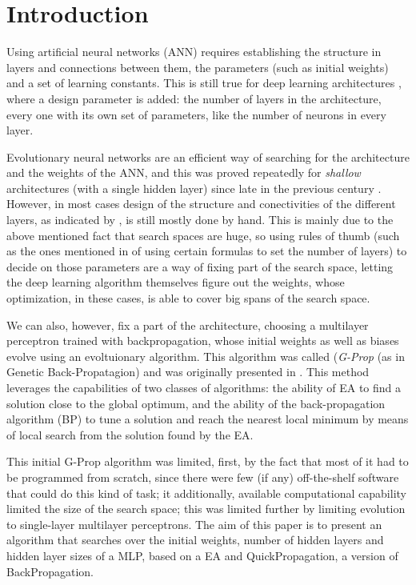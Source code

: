 \documentclass[runningheads]{llncs}
\begin{document}
\section{Introduction}

Using artificial neural networks (ANN) requires establishing the
structure in layers and connections between them, the parameters (such
as initial weights) and a set of learning constants. This is still
true for deep learning architectures \cite{goodfellow,nielsen}, where
a design parameter is added: the number of layers in the architecture,
every one with its own set of parameters, like the number of neurons
in every layer.

Evolutionary neural networks are an efficient way of searching for the
architecture and the weights of the ANN, and this was proved
repeatedly for {\em shallow} architectures (with a single hidden
layer) since late in the previous century
\cite{CastilloNPL,stanley2002evolving}. However, in most cases design
of the structure and conectivities of the different layers, as
indicated by \cite{miikkulainen2019evolving}, is still mostly done by
hand. This is mainly due to the above mentioned fact that search
spaces are huge, so using rules of thumb (such as the ones mentioned
in \cite{qolomany2017parameters} of using certain formulas to set the
number of layers) to decide on those parameters
are a way of fixing part of the search space, letting the deep
learning algorithm themselves figure out the weights, whose
optimization, in these cases, is able to cover big spans of the search
space.

We can also, however, fix a part of the architecture, choosing a
multilayer perceptron trained with backpropagation, whose initial
weights as well as biases evolve using an evoltuionary algorithm. This
algorithm was called (\emph{G-Prop} (as in Genetic Back-Propatagion)
and was originally presented in \cite{castilloNC,CastilloNPL}. This
method leverages the capabilities of two classes of algorithms: the
ability of EA to find a solution close to the global optimum, and the
ability of the back-propagation algorithm (BP) to tune a solution and
reach the nearest local minimum by means of local search from the
solution found by the EA.

This initial G-Prop algorithm was limited, first, by the fact that
most of it had to be programmed from scratch, since there were few (if
any) off-the-shelf software that could do this kind of task; it
additionally, available computational capability limited the size of
the search space; this was limited further by limiting evolution to
single-layer multilayer perceptrons. The aim of this paper is to
present an algorithm that searches over the initial weights, number of
hidden layers and hidden layer sizes of a MLP, based on a EA and
QuickPropagation, a version of BackPropagation. %
\end{document}
